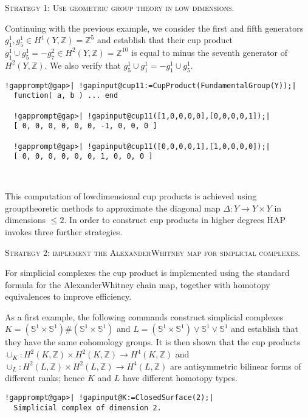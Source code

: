 \documentclass[a4paper,11pt]{report}
\begin{document}
{{\textsc{Strategy 1: Use geometric group theory in low dimensions.} 

Continuing with the previous example, we consider the first and fifth
generators $g_1^1, g_5^1\in H^1(Y,\mathbb Z) =\mathbb Z^5$ and establish that their cup product $ g_1^1 \cup g_5^1 = - g_7^2 \in H^2(Y,\mathbb Z) =\mathbb Z^{10}$ is equal to minus the seventh generator of $H^2(Y,\mathbb Z)$. We also verify that $g_5^1\cup g_1^1 = - g_1^1 \cup g_5^1$. 
\begin{Verbatim}[commandchars=!@|,fontsize=\small,frame=single,label=Example]
  !gapprompt@gap>| !gapinput@cup11:=CupProduct(FundamentalGroup(Y));|
  function( a, b ) ... end
  
  !gapprompt@gap>| !gapinput@cup11([1,0,0,0,0],[0,0,0,0,1]);|
  [ 0, 0, 0, 0, 0, 0, -1, 0, 0, 0 ]
  
  !gapprompt@gap>| !gapinput@cup11([0,0,0,0,1],[1,0,0,0,0]);|
  [ 0, 0, 0, 0, 0, 0, 1, 0, 0, 0 ]
  
  
\end{Verbatim}
 

This computation of low\texttt{}dimensional cup products is
achieved using group\texttt{}theoretic methods to approximate the
diagonal map $\Delta \colon Y \rightarrow Y\times Y$ in dimensions $\le 2$. In order to construct cup products in higher degrees \textsc{HAP} invokes three further strategies. 

\textsc{Strategy 2: implement the Alexander\texttt{}Whitney map for
simplicial complexes.} 

For simplicial complexes the cup product is implemented using the standard
formula for the Alexander\texttt{}Whitney chain map, together with
homotopy equivalences to improve efficiency. 

As a first example, the following commands construct simplicial complexes $K=(\mathbb S^1 \times \mathbb S^1) \# (\mathbb S^1 \times \mathbb S^1)$ and $L=(\mathbb S^1 \times \mathbb S^1) \vee \mathbb S^1 \vee \mathbb S^1$ and establish that they have the same cohomology groups. It is then shown that
the cup products $\cup_K\colon H^2(K,\mathbb Z)\times H^2(K,\mathbb Z) \rightarrow H^4(K,\mathbb
Z)$ and $\cup_L\colon H^2(L,\mathbb Z)\times H^2(L,\mathbb Z) \rightarrow H^4(L,\mathbb
Z)$ are antisymmetric bilinear forms of different ranks; hence $K$ and $L$ have different homotopy types. 
\begin{Verbatim}[commandchars=!@|,fontsize=\small,frame=single,label=Example]
  !gapprompt@gap>| !gapinput@K:=ClosedSurface(2);|
  Simplicial complex of dimension 2.
  

\end{Verbatim}}}
\end{document}
